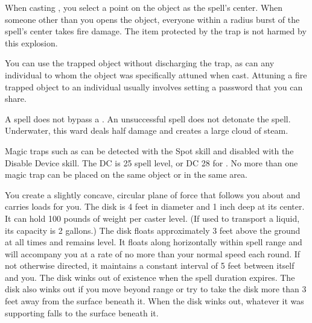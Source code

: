 \begin{spelleffect}
When casting , you select a point on the object as the spell's center. When someone other than you opens the object, everyone within a \areasmall radius burst of the spell's center takes fire damage. The item protected by the trap is not harmed by this explosion.
\par You can use the trapped object without discharging the trap, as can any individual to whom the object was specifically attuned when cast. Attuning a fire trapped object to an individual usually involves setting a password that you can share.
\end{spelleffect}
\begin{spellnotes}
A  spell does not bypass a . An unsuccessful  spell does not detonate the spell. Underwater, this ward deals half damage and creates a large cloud of steam.
\par Magic traps such as  can be detected with the Spot skill and disabled with the Disable Device skill. The DC is 25 \add spell level, or DC 28 for . No more than one magic trap can be placed on the same object or in the same area.
\end{spellnotes}

\spellrng{\rngmed}
\begin{spelleffect}
You create a slightly concave, circular plane of force that follows you about and carries loads for you. The disk is 4 feet in diameter and 1 inch deep at its center. It can hold 100 pounds of weight per caster level. (If used to transport a liquid, its capacity is 2 gallons.) The disk floats approximately 3 feet above the ground at all times and remains level. It floats along horizontally within spell range and will accompany you at a rate of no more than your normal speed each round. If not otherwise directed, it maintains a constant interval of 5 feet between itself and you. The disk winks out of existence when the spell duration expires. The disk also winks out if you move beyond range or try to take the disk more than 3 feet away from the surface beneath it. When the disk winks out, whatever it was supporting falls to the surface beneath it.
\end{spelleffect}

